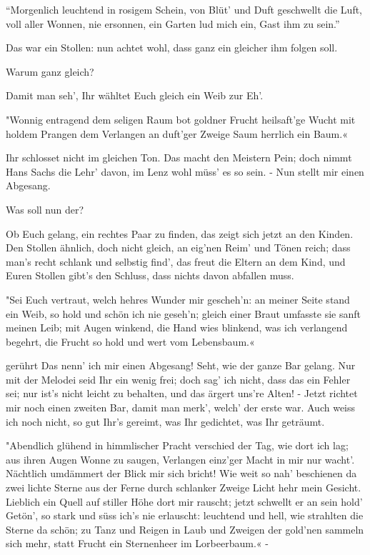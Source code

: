 \begin{drama}
\Waltherspeaks
{}

``Morgenlich leuchtend in rosigem Schein,
von Blüt' und Duft geschwellt die Luft,
voll aller Wonnen, nie ersonnen,
ein Garten lud mich ein, Gast ihm zu sein.''

\Sachsspeaks
Das war ein Stollen:
nun achtet wohl,
dass ganz ein gleicher ihm folgen soll.

\Waltherspeaks
Warum ganz gleich?

\Sachsspeaks
Damit man seh',
Ihr wähltet Euch gleich ein Weib zur Eh'.

\Waltherspeaks
"Wonnig entragend dem seligen Raum
bot goldner Frucht heilsaft'ge Wucht
mit holdem Prangen dem Verlangen
an duft'ger Zweige Saum herrlich ein Baum.«

\Sachsspeaks
Ihr schlosset nicht im gleichen Ton.
Das macht den Meistern Pein;
doch nimmt Hans Sachs die Lehr' davon,
im Lenz wohl müss' es so sein. -
Nun stellt mir einen Abgesang.

\Waltherspeaks
Was soll nun der?

\Sachsspeaks
Ob Euch gelang,
ein rechtes Paar zu finden,
das zeigt sich jetzt an den Kinden.
Den Stollen ähnlich, doch nicht gleich,
an eig'nen Reim' und Tönen reich;
dass man's recht schlank und selbstig find',
das freut die Eltern an dem Kind,
und Euren Stollen gibt's den Schluss,
dass nichts davon abfallen muss.

\Waltherspeaks
"Sei Euch vertraut,
welch hehres Wunder mir gescheh'n:
an meiner Seite stand ein Weib,
so hold und schön ich nie geseh'n;
gleich einer Braut
umfasste sie sanft meinen Leib;
mit Augen winkend,
die Hand wies blinkend,
was ich verlangend begehrt,
die Frucht so hold und wert
vom Lebensbaum.«

\Sachsspeaks
gerührt
Das nenn' ich mir einen Abgesang!
Seht, wie der ganze Bar gelang.
Nur mit der Melodei seid Ihr ein wenig frei;
doch sag' ich nicht, dass das ein Fehler sei;
nur ist's nicht leicht zu behalten,
und das ärgert uns're Alten! -
Jetzt richtet mir noch einen zweiten Bar,
damit man merk', welch' der erste war.
Auch weiss ich noch nicht, so gut Ihr's gereimt,
was Ihr gedichtet, was Ihr geträumt.

\Waltherspeaks
"Abendlich glühend in himmlischer Pracht
verschied der Tag, wie dort ich lag;
aus ihren Augen Wonne zu saugen,
Verlangen einz'ger Macht in mir nur wacht'.
Nächtlich umdämmert der Blick mir sich bricht!
Wie weit so nah' beschienen da
zwei lichte Sterne aus der Ferne
durch schlanker Zweige Licht hehr mein Gesicht.
Lieblich ein Quell
auf stiller Höhe dort mir rauscht;
jetzt schwellt er an sein hold' Getön',
so stark und süss ich's nie erlauscht:
leuchtend und hell, wie strahlten die Sterne da schön;
zu Tanz und Reigen in Laub und Zweigen
der gold'nen sammeln sich mehr,
statt Frucht ein Sternenheer
im Lorbeerbaum.« -


\end{drama}
